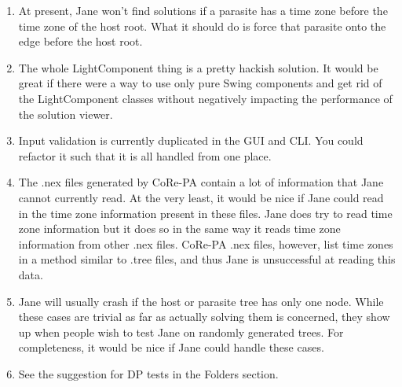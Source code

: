 \documentclass{article}
\begin{document}
\begin{enumerate}
\item At present, Jane won't find solutions if a parasite has a time zone before the time zone of the host root. What it should do is force that parasite onto the edge before the host root.

\item The whole LightComponent thing is a pretty hackish solution. It would be great if there were a way to use only pure Swing components and get rid of the LightComponent classes without negatively impacting the performance of the solution viewer.

\item Input validation is currently duplicated in the GUI and CLI. You could refactor it such that it is all handled from one place.

\item The .nex files generated by CoRe-PA contain a lot of information that Jane cannot currently read. At the very least, it would be nice if Jane could read in the time zone information present in these files. Jane does try to read time zone information but it does so in the same way it reads time zone information from other .nex files. CoRe-PA .nex files, however, list time zones in a method similar to .tree files, and thus Jane is unsuccessful at reading this data. 

\item Jane will usually crash if the host or parasite tree has only one node. While these cases are trivial as far as actually solving them is concerned, they show up when people wish to test Jane on randomly generated trees. For completeness, it would be nice if Jane could handle these cases. 

\item See the suggestion for DP tests in the Folders section.
\end{enumerate}
\end{document}
